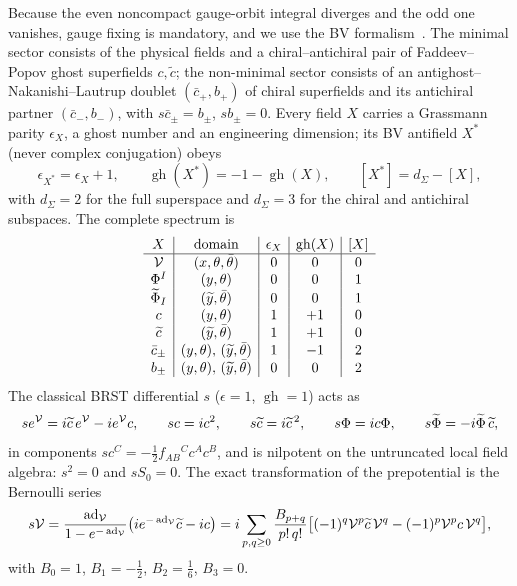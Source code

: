 Because the even noncompact gauge-orbit integral diverges and the odd one vanishes, gauge fixing is mandatory, and we use the BV formalism~\cite{BV}. The minimal sector consists of the physical fields and a chiral--antichiral pair of Faddeev--Popov ghost superfields $c,\widetilde c$; the non-minimal sector consists of an antighost--Nakanishi--Lautrup doublet $(\bar c_+,b_+)$ of chiral superfields and its antichiral partner $(\bar c_-,b_-)$, with $s\bar c_\pm=b_\pm$, $sb_\pm=0$. Every field $X$ carries a Grassmann parity $\epsilon_X$, a ghost number and an engineering dimension; its BV antifield $X^*$ (never complex conjugation) obeys
\begin{equation}\label{eq:gaugebv:antifield}
\epsilon_{X^*}=\epsilon_X+1,\qquad
\operatorname{gh}(X^*)=-1-\operatorname{gh}(X),\qquad
[X^*]=d_\Sigma-[X],
\end{equation}
with $d_\Sigma=2$ for the full superspace and $d_\Sigma=3$ for the chiral and antichiral subspaces. The complete spectrum is
\begin{equation}\label{eq:gaugebv:spectrum}
\begin{array}{c|c|c|c|c}
X&\text{domain}&\epsilon_X&\operatorname{gh}(X)&[X]\\ \hline
\mathcal{V}&(x,\theta,\bar\theta)&0&0&0\\
\Phi^I&(y,\theta)&0&0&1\\
\widetilde\Phi_I&(\widetilde y,\bar\theta)&0&0&1\\
c&(y,\theta)&1&+1&0\\
\widetilde c&(\widetilde y,\bar\theta)&1&+1&0\\
\bar c_\pm&(y,\theta),\,(\widetilde y,\bar\theta)&1&-1&2\\
b_\pm&(y,\theta),\,(\widetilde y,\bar\theta)&0&0&2
\end{array}
\end{equation}
The classical BRST differential $s$ ($\epsilon=1$, $\operatorname{gh}=1$) acts as
\begin{equation}\label{eq:gaugebv:brst}
se^{\mathcal{V}}=i\widetilde c\,e^{\mathcal{V}}-ie^{\mathcal{V}} c,\qquad
sc=ic^2,\qquad
s\widetilde c=i\widetilde c^{\,2},\qquad
s\Phi=ic\Phi,\qquad
s\widetilde\Phi=-i\widetilde\Phi\,\widetilde c,
\end{equation}
in components $sc^C=-\tfrac12 f_{AB}{}^Cc^Ac^B$, and is nilpotent on the untruncated local field algebra: $s^2=0$ and $sS_0=0$. The exact transformation of the prepotential is the Bernoulli series
\begin{equation}\label{eq:gaugebv:brstV}
s\mathcal{V}=\frac{\operatorname{ad}_{\mathcal{V}}}{1-e^{-\operatorname{ad}_{\mathcal{V}}}}\bigl(ie^{-\operatorname{ad}_{\mathcal{V}}}\widetilde c-ic\bigr)
=i\sum_{p,q\ge0}\frac{B_{p+q}}{p!\,q!}\bigl[(-1)^q\mathcal{V}^p\widetilde c\,\mathcal{V}^q-(-1)^p\mathcal{V}^p c\,\mathcal{V}^q\bigr],
\end{equation}
with $B_0=1$, $B_1=-\tfrac12$, $B_2=\tfrac16$, $B_3=0$.

